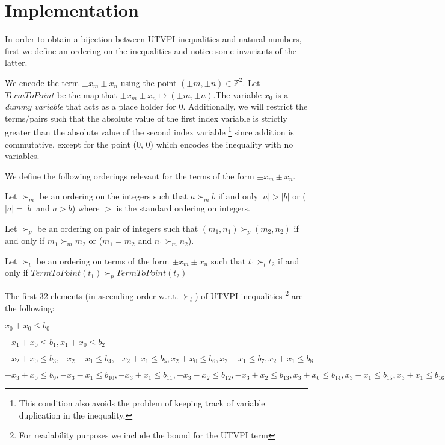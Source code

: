 %

\section{Implementation}

In order to obtain a bijection between UTVPI inequalities and
natural numbers, first we define an ordering on the inequalities
and notice some invariants of the latter. 

We encode the term $\pm x_m \pm x_n$ using the point
$(\pm m, \pm n) \in \mathbb{Z}^2$. Let $TermToPoint$ be the map
that $\pm x_m \pm x_n \mapsto (\pm m, \pm n)$.The variable $x_0$ is a
\emph{dummy variable} that acts as a place holder for 0. 
Additionally, we will restrict the terms/pairs such that the absolute
value of the first index variable is strictly greater than the
absolute value of the second index variable \footnote{This condition also
  avoids the problem of keeping track of variable duplication in 
the inequality.} since addition is commutative, except for the point
(0, 0) which encodes the inequality with no variables.

We define the following orderings relevant for the terms of the form
$\pm x_m \pm x_n$.

\begin{definition} 
  Let $\succ_m$ be an ordering on the integers such that $a \succ_m b$
  if and only $|a| > |b|$ or ($|a| = |b|$ and $a > b$) where $>$ is the
  standard ordering on integers.

  Let $\succ_p$ be an ordering on pair of integers such that 
  $(m_1, n_1) \succ_p (m_2, n_2)$ if and only if $m_1 \succ_m m_2$
  or ($m_1 = m_2$ and $n_1 \succ_m n_2$).

  Let $\succ_t$ be an ordering on terms of the form $\pm x_m \pm x_n$
  such that $t_1 \succ_t t_2$ if and only if $TermToPoint(t_1) \succ_p TermToPoint(t_2)$
\end{definition}

\begin{example}
  The first 32 elements (in ascending order w.r.t. $\succ_t$) of UTVPI inequalities
  \footnote{For readability purposes we include the bound for the UTVPI term }
  are the following:

  $x_{0} + x_{0} \leq b_{0}$

  $-x_{1} + x_{0} \leq b_{1}, x_{1} + x_{0} \leq b_{2}$ 

  $-x_{2} + x_{0} \leq b_{3}, -x_{2} - x_{1} \leq b_{4}, -x_{2} + x_{1} \leq b_{5}, x_{2} + x_{0} \leq b_{6}, x_{2} - x_{1} \leq b_{7}, x_{2} + x_{1} \leq b_{8}$

  $-x_{3} + x_{0} \leq b_{9}, -x_{3} - x_{1} \leq b_{10}, -x_{3} + x_{1} \leq b_{11}, -x_{3} - x_{2} \leq b_{12}, -x_{3} + x_{2} \leq b_{13},x_{3} + x_{0} \leq b_{14}, x_{3} - x_{1} \leq b_{15}, x_{3} + x_{1} \leq b_{16}, x_{3} - x_{2} \leq b_{17}, x_{3} + x_{2} \leq b_{18}$
\end{example}

